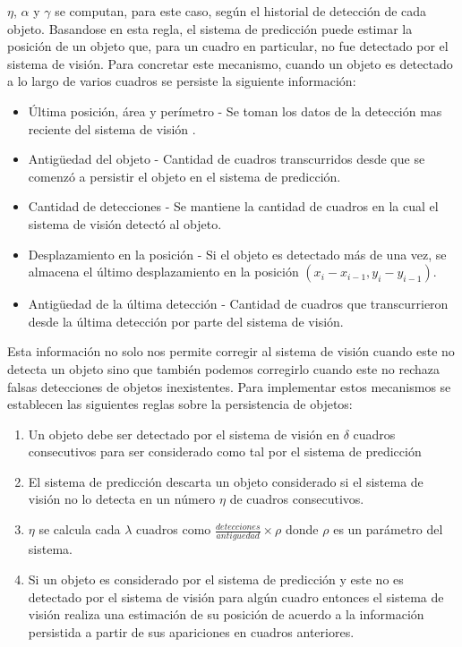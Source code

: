 $\eta$, $\alpha$ y $\gamma$ se computan, para este caso, según el 
historial de detección de cada objeto.  Basandose en esta regla, el 
sistema de predicción puede estimar la posición de un objeto que, 
para un cuadro en particular, no fue detectado por el sistema de 
visión. Para concretar este mecanismo, cuando un objeto es detectado a lo largo de varios cuadros se persiste la siguiente información:
\begin{itemize}
\item{ Última posición, área y perímetro - Se toman los datos de la detección mas reciente del sistema de visión .}
\item{ Antigüedad del objeto - Cantidad de cuadros transcurridos desde que se comenzó a persistir el objeto en el sistema de predicción.}
\item{ Cantidad de detecciones - Se mantiene la cantidad de cuadros en la cual el sistema de visión detectó al objeto.}
\item{ Desplazamiento en la posición - Si el objeto es detectado más 
de una vez, se almacena el último desplazamiento en la posición $(x_i - 
x_{i-1} , y_i - y_{i-1} )$.}
\item{ Antigüedad de la última detección - Cantidad de cuadros que transcurrieron desde la última detección por parte del sistema de visión.}  
\end{itemize}
Esta información no solo nos permite corregir al sistema de visión 
cuando este no detecta un objeto sino que también podemos corregirlo 
cuando este no rechaza falsas detecciones de objetos inexistentes. Para 
implementar estos mecanismos se establecen las siguientes reglas sobre 
la persistencia de objetos:
\begin{enumerate}
\item{Un objeto debe ser detectado por el sistema de visión en $\delta$ 
cuadros consecutivos para ser considerado como tal por el sistema de 
predicción}
\item{El sistema de predicción descarta un objeto considerado si el 
sistema de visión no lo detecta en un número $\eta$ de cuadros 
consecutivos.}
\item{ $\eta$ se calcula cada $\lambda$ cuadros como 
$\frac{detecciones}{antiguedad}\times \rho$ donde $\rho$ es un parámetro del 
sistema}.
\item{ Si un objeto es considerado por el sistema de predicción y este 
no es detectado por el sistema de visión para algún cuadro entonces 
el sistema de visión realiza una estimación de su posición de 
acuerdo a la información persistida a partir de sus apariciones en cuadros anteriores.}
\end{enumerate}

